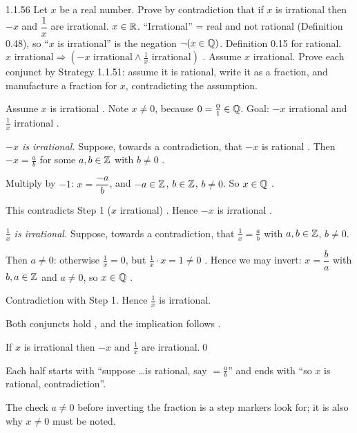 \begin{bookex}[essential]{1.1.56}
Let $x$ be a real number. Prove by contradiction that if $x$ is irrational then $-x$ and $\dfrac1x$ are irrational.
\solution
\given $x\in\mathbb{R}$. ``Irrational'' = real and not rational (Definition 0.48), so ``$x$ is irrational'' is the negation $\neg(x\in\mathbb{Q})$. Definition 0.15 for rational.
\goal $x\text{ irrational}\Rightarrow(-x\text{ irrational}\wedge\tfrac1x\text{ irrational})$ .
\plan Assume $x$ irrational. Prove each conjunct by Strategy 1.1.51: assume it is rational, write it as a fraction, and manufacture a fraction for $x$, contradicting the assumption.
\begin{steps}
\item Assume $x$ is irrational . Note $x\ne0$, because $0=\frac01\in\mathbb{Q}$. Goal: $-x$ irrational and $\frac1x$ irrational .
\item \emph{$-x$ is irrational.} Suppose, towards a contradiction, that $-x$ is rational . Then $-x=\frac ab$ for some $a,b\in\mathbb{Z}$ with $b\ne0$ .
\item Multiply by $-1$: $x=\dfrac{-a}{b}$, and $-a\in\mathbb{Z}$, $b\in\mathbb{Z}$, $b\ne0$. So $x\in\mathbb{Q}$ .
\item This contradicts Step 1 ($x$ irrational) . Hence $-x$ is irrational .
\item \emph{$\frac1x$ is irrational.} Suppose, towards a contradiction, that $\frac1x=\frac ab$ with $a,b\in\mathbb{Z}$, $b\ne0$.
\item Then $a\ne0$: otherwise $\frac1x=0$, but $\frac1x\cdot x=1\ne0$ . Hence we may invert: $x=\dfrac ba$ with $b,a\in\mathbb{Z}$ and $a\ne0$, so $x\in\mathbb{Q}$ .
\item Contradiction with Step 1. Hence $\frac1x$ is irrational.
\item Both conjuncts hold , and the implication follows .
\end{steps}
\conclusion If $x$ is irrational then $-x$ and $\frac1x$ are irrational.\qed
\begin{compare}
\item Each half starts with ``suppose \dots is rational, say $=\frac ab$'' and ends with ``so $x$ is rational, contradiction''.
\item The check $a\ne0$ before inverting the fraction is a step markers look for; it is also why $x\ne0$ must be noted.
\end{compare}
\end{bookex}

